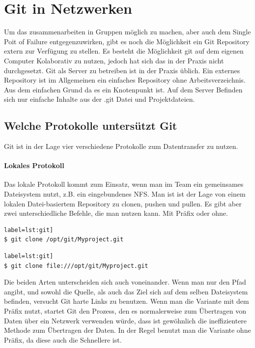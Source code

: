 \documentclass[12pt,a4paper,bibliography=totocnumbered,listof=totocnumbered]{scrartcl}
\begin{document}
\section{Git in Netzwerken}
Um das zusammenarbeiten in Gruppen möglich zu machen, aber auch dem Single Poit of Failure  entgegenzuwirken, gibt es noch die Möglichkeit  ein Git Repository extern zur Verfügung zu stellen. Es besteht die Möglichkeit git auf dem eigenen Computer Kolaborativ zu nutzen, jedoch hat sich das in der Praxis nicht durchgesetzt. Git als Server zu betreiben ist in der Praxis üblich. Ein externes Repository  ist im Allgemeinen ein einfaches Repository ohne Arbeitsverzeichnis. 
Aus dem einfachen Grund da es ein Knotenpunkt ist. Auf dem Server Befinden sich nur einfache Inhalte aus der .git Datei und Projektdateien.

\subsection{Welche Protokolle untersützt Git}
Git ist in der Lage vier verschiedene Protokolle zum Datentransfer zu nutzen.
\paragraph{Lokales Protokoll}
Das lokale Protokoll kommt zum Einsatz, wenn man im Team ein gemeinsames Dateisystem nutzt, z.B. ein eingebundenes NFS. Man ist ist der Lage  von einem lokalen Datei-basiertem Repository zu clonen, pushen und pullen. 
Es gibt aber zwei unterschiedliche Befehle, die man nutzen kann. Mit Präfix oder ohne.

\begin{lstlisting}[caption=Ohne Präfix] label=lst:git]
$ git clone /opt/git/Myproject.git
\end{lstlisting}

\begin{lstlisting}[caption=Mit Präfix] label=lst:git]
$ git clone file:///opt/git/Myproject.git
\end{lstlisting}

Die beiden Arten unterscheiden sich auch voneinander.
Wenn man nur den Pfad angibt, und sowohl die Quelle, als auch das Ziel sich auf dem selben Dateisystem befinden, versucht Git harte Links zu benutzen. Wenn man die Variante mit dem Präfix nutzt, startet Git den Prozess, den es normalerweise zum Übertragen von Daten über ein Netzwerk verwenden würde, dass ist gewöhnlich die ineffizientere Methode zum Übertragen der Daten. In der Regel benutzt man die Variante ohne Präfix, da diese auch die Schnellere ist.	
\end{document}
